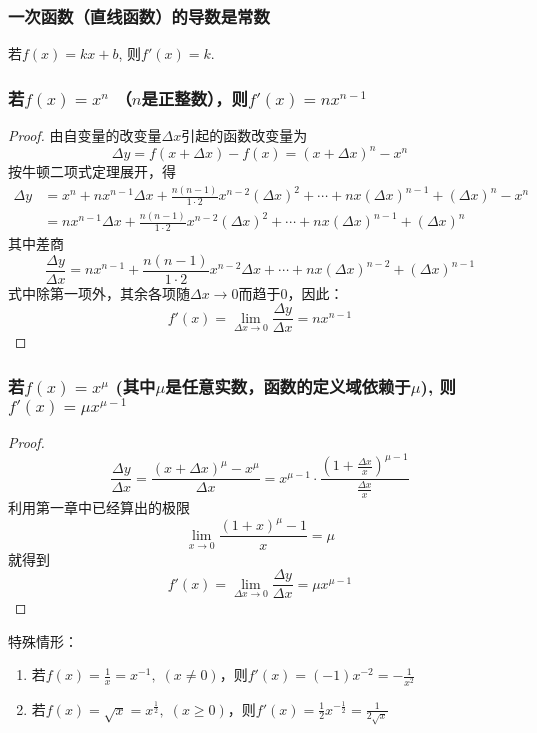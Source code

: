 \subsubsection{一次函数（直线函数）的导数是常数}

若$f(x)=kx+b$, 则$f'(x)=k$. 

\subsubsection{若$f(x)=x^n$ （$n$是正整数），则$f'(x)=nx^{n-1}$}

\begin{proof}
  由自变量的改变量$\Delta x$引起的函数改变量为
\[\Delta y=f (x+\Delta x) -f (x) = (x+\Delta x)^n-x^n\] 
按牛顿二项式定理展开，得  
\begin{align*}
\Delta y&= x^n+nx^{n-1}\Delta x+\frac{n(n-1)}{1\cdot 2}x^{n-2}(\Delta x)^2+\cdots+nx(\Delta x)^{n-1}+(\Delta x)^n-x^n\\
&=nx^{n-1}\Delta x+\frac{n(n-1)}{1\cdot 2}x^{n-2}(\Delta x)^2+\cdots+nx(\Delta x)^{n-1}+(\Delta x)^n
\end{align*}
其中差商
\[\frac{\Delta y}{\Delta x}=nx^{n-1}+\frac{n(n-1)}{1\cdot 2}x^{n-2}\Delta x+\cdots+nx(\Delta x)^{n-2}+(\Delta x)^{n-1}\]
式中除第一项外，其余各项随$\Delta x\to 0$而趋于0，因此：
\[f'(x)=\lim_{\Delta x\to 0}\frac{\Delta y}{\Delta x}=nx^{n-1}\]
\end{proof}

\subsubsection{若$f(x)=x^{\mu}$ (其中$\mu$是任意实数，函数的定义域依赖于$\mu$), 则$f'(x)=\mu x^{\mu-1}$}

\begin{proof}
    \[\frac{\Delta y}{\Delta x}=\frac{(x+\Delta x)^{\mu}-x^{\mu}}{\Delta x}=x^{\mu-1}\cdot \frac{\left(1+\frac{\Delta x}{x}\right)^{\mu-1}}{\frac{\Delta x}{x}}\]
利用第一章中已经算出的极限
\[\lim_{x\to 0}\frac{(1+x)^{\mu}-1}{x}=\mu\]
就得到
\[f'(x)=\lim_{\Delta x\to 0}\frac{\Delta y}{\Delta x}=\mu x^{\mu-1}\]
\end{proof}

特殊情形：
\begin{enumerate}
    \item 若$f(x)=\frac{1}{x}=x^{-1},\; (x\ne 0)$，则$f'(x)=(-1)x^{-2}=-\frac{1}{x^2}$
    \item 若$f(x)=\sqrt{x}=x^{\tfrac{1}{2}},\; (x\ge 0)$，则$f'(x)=\frac{1}{2}x^{-\tfrac{1}{2}}=\frac{1}{2\sqrt{x}}$
\end{enumerate}

